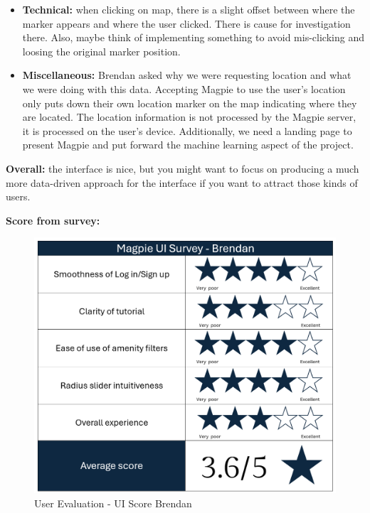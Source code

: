 \begin{itemize}
    \item \textbf{Technical: }when clicking on map, there is a slight offset
          between where the marker appears and where the user clicked. There is cause
          for investigation there. Also, maybe think of implementing something to
          avoid mis-clicking and loosing the original marker position.
          
          \newpage{}
          
    \item \textbf{Miscellaneous: }Brendan asked why we were requesting location
          and what we were doing with this data. Accepting Magpie to use the user's
          location only puts down their own location marker on the map indicating
          where they are located. The location information is not processed by the
          Magpie server, it is processed on the user's device. Additionally, we need
          a landing page to present Magpie and put forward the machine learning aspect
          of the project.
\end{itemize}

\textbf{Overall: }the interface is nice, but you might want to focus on
producing a much more data-driven approach for the interface if you want to
attract those kinds of users.

\textbf{Score from survey: }
\begin{figure}[h!]
    \centering
    \includegraphics[width=\textwidth]{images/survey-brendan.png}
    \caption{User Evaluation - UI Score Brendan}
\end{figure}

